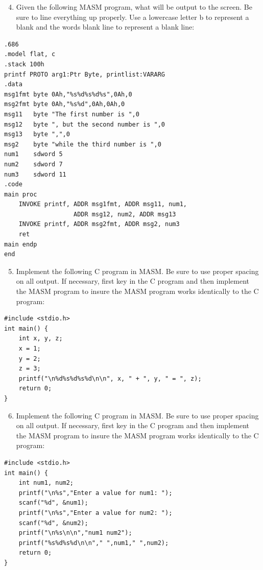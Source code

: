 \documentclass[10pt]{book}
\begin{document}
\begin{enumerate}
  \setcounter{enumi}{3}
  \item Given the following MASM program, what will be output to the screen. Be sure to line everything up properly. Use a lowercase letter b to represent a blank and the words blank line to represent a blank line:
\end{enumerate}

\begin{verbatim}
.686
.model flat, c
.stack 100h
printf PROTO arg1:Ptr Byte, printlist:VARARG
.data
msg1fmt byte 0Ah,"%s%d%s%d%s",0Ah,0
msg2fmt byte 0Ah,"%s%d",0Ah,0Ah,0
msg11   byte "The first number is ",0
msg12   byte ", but the second number is ",0
msg13   byte ",",0
msg2    byte "while the third number is ",0
num1    sdword 5
num2    sdword 7
num3    sdword 11
.code
main proc
    INVOKE printf, ADDR msg1fmt, ADDR msg11, num1,
                   ADDR msg12, num2, ADDR msg13
    INVOKE printf, ADDR msg2fmt, ADDR msg2, num3
    ret
main endp
end
\end{verbatim}

\begin{enumerate}
  \setcounter{enumi}{4}
  \item Implement the following C program in MASM. Be sure to use proper spacing on all output. If necessary, first key in the C program and then implement the MASM program to insure the MASM program works identically to the C program:
\end{enumerate}

\begin{verbatim}
#include <stdio.h>
int main() {
    int x, y, z;
    x = 1;
    y = 2;
    z = 3;
    printf("\n%d%s%d%s%d\n\n", x, " + ", y, " = ", z);
    return 0;
}
\end{verbatim}

\begin{enumerate}
  \setcounter{enumi}{5}
  \item Implement the following C program in MASM. Be sure to use proper spacing on all output. If necessary, first key in the C program and then implement the MASM program to insure the MASM program works identically to the C program:
\end{enumerate}

\begin{verbatim}
#include <stdio.h>
int main() {
    int num1, num2;
    printf("\n%s","Enter a value for num1: ");
    scanf("%d", &num1);
    printf("\n%s","Enter a value for num2: ");
    scanf("%d", &num2);
    printf("\n%s\n\n","num1 num2");
    printf("%s%d%s%d\n\n"," ",num1," ",num2);
    return 0;
}
\end{verbatim}
\end{document}

